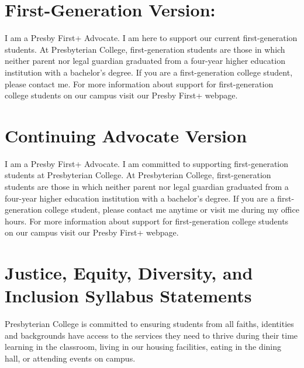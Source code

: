 \documentclass[
]{book}
\begin{document}
\hypertarget{first-generation-version}{%
\section*{First-Generation Version:}\label{first-generation-version}}

I am a Presby First+ Advocate. I am here to support our current first-generation students. At Presbyterian College, first-generation students are those in which neither parent nor legal guardian graduated from a four-year higher education institution with a bachelor's degree. If you are a first-generation college student, please contact me. For more information about support for first-generation college students on our campus visit our Presby First+ webpage.

\hypertarget{continuing-advocate-version}{%
\section*{Continuing Advocate Version}\label{continuing-advocate-version}}

I am a Presby First+ Advocate. I am committed to supporting first-generation students at Presbyterian College. At Presbyterian College, first-generation students are those in which neither parent nor legal guardian graduated from a four-year higher education institution with a bachelor's degree. If you are a first-generation college student, please contact me anytime or visit me during my office hours. For more information about support for first-generation college students on our campus visit our Presby First+ webpage.

\hypertarget{justice-equity-diversity-and-inclusion-syllabus-statements}{%
\section*{Justice, Equity, Diversity, and Inclusion Syllabus Statements}\label{justice-equity-diversity-and-inclusion-syllabus-statements}}

Presbyterian College is committed to ensuring students from all faiths, identities and backgrounds have access to the services they need to thrive during their time learning in the classroom, living in our housing facilities, eating in the dining hall, or attending events on campus.
\end{document}
